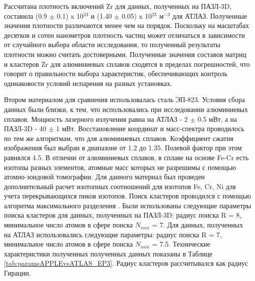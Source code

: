 Рассчитана плотность включений Zr для данных, полученных на ПАЗЛ-3D, составила (0.9 $\pm$ 0.1) x 10$^{23}$ и (1.40 $\pm$ 0.05) x 10$^{23}$ м$^{-3}$ для АТЛАЗ. Полученные значения плотности различаются менее чем на порядок. Поскольку на масштабах десятков и сотен нанометров плотность частиц может отличаться в зависимости от случайного выбора области исследования, то полученный результаты плотности можно считать достоверными. Полученные значения составов матриц и кластеров Zr для алюминиевых сплавов сходятся в пределах погрешностей, что говорит о правильности выбора характеристик, обеспечивающих контроль одинаковости условий испарения на разных установках.


\FloatBarrier

Втором материалом для сравнения использовалась сталь ЭП-823. Условия сбора данных были близки, к тем, что использовались при исследовании алюминиевых сплавов. Мощность лазерного излучения равна на АТЛАЗ - 2 $\pm$ 0.5 мВт, а на ПАЗЛ-3D - 40 $\pm$ 1 мВт. Восстановление координат и масс-спектра проводилось по тем же алгоритмам, что для алюминиевых сплавов. Коэффициент сжатия изображения был выбран в диапазоне от 1.2 до 1.35. Полевой фактор при этом равнялся 4.5. В отличии от алюминиевых сплавов, в сплаве на основе Fe-Cr есть изотопы разных элементов, атомные масс которых не разрешимы с помощью атомно-зондовой томографии. Для данного материал был проведен дополнительный расчет изотопных соотношений для изотопов Fe, Cr, Ni для учета перекрывающихся пиков изотопов. Поиск кластеров проводился с помощью алгоритма максимального разделения \cite{Vurpillot16}. Были использованы следующие параметры поиска кластеров для данных, полученных на ПАЗЛ-3D: радиус поиска R = 8, минимальное число атомов в сфере поиска $N_{min}$ = 7. Для данных, полученных на АТЛАЗ использовались следующие параметры: радиус поиска R = 7, минимальное число атомов в сфере поиска $N_{min}$ = 7.5. Технические характеристики полученных полученных данных показаны в Таблице \cref{tab:paramsAPPLEvsATLAS_EP3}. Радиус кластеров рассчитывался как радиус Гирации.

